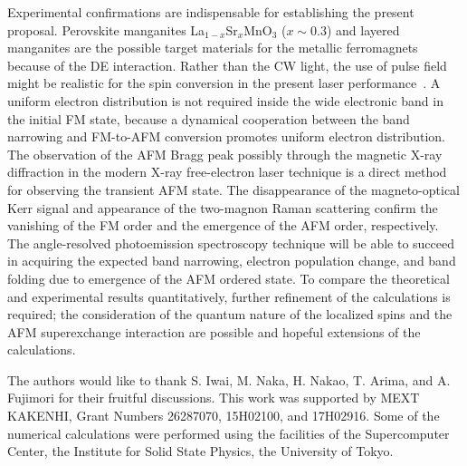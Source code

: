 \documentclass[aps,twocolumn,showpacs,prl,amsmath,amssymb]{revtex4-1}
\begin{document}
Experimental confirmations are indispensable for establishing the present proposal. 
Perovskite manganites La$_{1-x}$Sr$_{x}$MnO$_3$ ($x \sim 0.3$) and layered manganites are the possible target materials for the metallic ferromagnets because of the DE interaction. 
Rather than the CW light, the use of pulse field might be realistic for the spin conversion in the present laser performance~\cite{ampli}. 
A uniform electron distribution is not required inside the wide electronic band in the initial FM state,
because a dynamical cooperation between the band narrowing and FM-to-AFM conversion promotes uniform electron distribution. 
The observation of the AFM Bragg peak possibly through the magnetic X-ray diffraction in the modern X-ray free-electron laser technique is a direct method for observing the transient AFM state.
The disappearance of the magneto-optical Kerr signal and appearance of the two-magnon Raman scattering confirm the vanishing of the FM order and the emergence of the AFM order, respectively. 
The angle-resolved photoemission spectroscopy technique will be able to succeed in acquiring the expected band narrowing, electron population change, and band folding due to emergence of the AFM ordered state. 
%
To compare the theoretical and experimental results quantitatively, further refinement of the calculations is required; the consideration of the quantum nature of the localized spins and the AFM superexchange interaction are possible and hopeful extensions of the calculations. 

The authors would like to thank S. Iwai, M. Naka, H. Nakao, T. Arima, and A. Fujimori for their fruitful discussions. 
This work was supported by MEXT KAKENHI, Grant Numbers 26287070, 15H02100, and 17H02916. 
Some of the numerical calculations were performed using the facilities of the Supercomputer Center, the Institute for Solid State Physics, the University of Tokyo.
\end{document}
